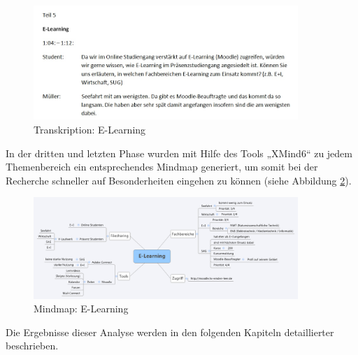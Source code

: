 \begin{figure}[h!]
	\centering
	\includegraphics[width=10cm]{kapitel/gruppe2/bilder/E-Learning_Transkription}
	\caption{Transkription: E-Learning}
	\label{fig_E-Learning_Transkription}
\end{figure}

In der dritten und letzten Phase wurden mit Hilfe des Tools „XMind6“ zu jedem Themenbereich ein entsprechendes Mindmap generiert, um somit bei der Recherche schneller auf Besonderheiten eingehen zu können  (siehe Abbildung \ref{fig_E-Learning_MM}).

\begin{figure}[h!]
	\centering
	\includegraphics[width=10cm]{kapitel/gruppe2/bilder/E-Learning_MM}
	\caption{Mindmap: E-Learning}
	\label{fig_E-Learning_MM}
\end{figure}

Die Ergebnisse dieser Analyse werden in den folgenden Kapiteln detaillierter beschrieben. 

